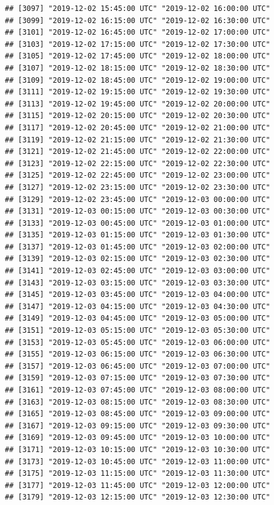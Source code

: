 \documentclass{article}\usepackage[]{graphicx}\usepackage[]{color}
\makeatletter
\newenvironment{kframe}{%
 \def\at@end@of@kframe{}%
 \ifinner\ifhmode%
  \def\at@end@of@kframe{\end{minipage}}%
  \begin{minipage}{\columnwidth}%
 \fi\fi%
 \def\FrameCommand##1{\hskip\@totalleftmargin \hskip-\fboxsep
 \colorbox{shadecolor}{##1}\hskip-\fboxsep
     \hskip-\linewidth \hskip-\@totalleftmargin \hskip\columnwidth}%
 \MakeFramed {\advance\hsize-\width
   \@totalleftmargin\z@ \linewidth\hsize
   \@setminipage}}%
 {\par\unskip\endMakeFramed%
 \at@end@of@kframe}
\newenvironment{knitrout}{}{} %
\makeatother
\begin{document}
\begin{knitrout}
\begin{kframe}
\begin{verbatim}
## [3097] "2019-12-02 15:45:00 UTC" "2019-12-02 16:00:00 UTC"
## [3099] "2019-12-02 16:15:00 UTC" "2019-12-02 16:30:00 UTC"
## [3101] "2019-12-02 16:45:00 UTC" "2019-12-02 17:00:00 UTC"
## [3103] "2019-12-02 17:15:00 UTC" "2019-12-02 17:30:00 UTC"
## [3105] "2019-12-02 17:45:00 UTC" "2019-12-02 18:00:00 UTC"
## [3107] "2019-12-02 18:15:00 UTC" "2019-12-02 18:30:00 UTC"
## [3109] "2019-12-02 18:45:00 UTC" "2019-12-02 19:00:00 UTC"
## [3111] "2019-12-02 19:15:00 UTC" "2019-12-02 19:30:00 UTC"
## [3113] "2019-12-02 19:45:00 UTC" "2019-12-02 20:00:00 UTC"
## [3115] "2019-12-02 20:15:00 UTC" "2019-12-02 20:30:00 UTC"
## [3117] "2019-12-02 20:45:00 UTC" "2019-12-02 21:00:00 UTC"
## [3119] "2019-12-02 21:15:00 UTC" "2019-12-02 21:30:00 UTC"
## [3121] "2019-12-02 21:45:00 UTC" "2019-12-02 22:00:00 UTC"
## [3123] "2019-12-02 22:15:00 UTC" "2019-12-02 22:30:00 UTC"
## [3125] "2019-12-02 22:45:00 UTC" "2019-12-02 23:00:00 UTC"
## [3127] "2019-12-02 23:15:00 UTC" "2019-12-02 23:30:00 UTC"
## [3129] "2019-12-02 23:45:00 UTC" "2019-12-03 00:00:00 UTC"
## [3131] "2019-12-03 00:15:00 UTC" "2019-12-03 00:30:00 UTC"
## [3133] "2019-12-03 00:45:00 UTC" "2019-12-03 01:00:00 UTC"
## [3135] "2019-12-03 01:15:00 UTC" "2019-12-03 01:30:00 UTC"
## [3137] "2019-12-03 01:45:00 UTC" "2019-12-03 02:00:00 UTC"
## [3139] "2019-12-03 02:15:00 UTC" "2019-12-03 02:30:00 UTC"
## [3141] "2019-12-03 02:45:00 UTC" "2019-12-03 03:00:00 UTC"
## [3143] "2019-12-03 03:15:00 UTC" "2019-12-03 03:30:00 UTC"
## [3145] "2019-12-03 03:45:00 UTC" "2019-12-03 04:00:00 UTC"
## [3147] "2019-12-03 04:15:00 UTC" "2019-12-03 04:30:00 UTC"
## [3149] "2019-12-03 04:45:00 UTC" "2019-12-03 05:00:00 UTC"
## [3151] "2019-12-03 05:15:00 UTC" "2019-12-03 05:30:00 UTC"
## [3153] "2019-12-03 05:45:00 UTC" "2019-12-03 06:00:00 UTC"
## [3155] "2019-12-03 06:15:00 UTC" "2019-12-03 06:30:00 UTC"
## [3157] "2019-12-03 06:45:00 UTC" "2019-12-03 07:00:00 UTC"
## [3159] "2019-12-03 07:15:00 UTC" "2019-12-03 07:30:00 UTC"
## [3161] "2019-12-03 07:45:00 UTC" "2019-12-03 08:00:00 UTC"
## [3163] "2019-12-03 08:15:00 UTC" "2019-12-03 08:30:00 UTC"
## [3165] "2019-12-03 08:45:00 UTC" "2019-12-03 09:00:00 UTC"
## [3167] "2019-12-03 09:15:00 UTC" "2019-12-03 09:30:00 UTC"
## [3169] "2019-12-03 09:45:00 UTC" "2019-12-03 10:00:00 UTC"
## [3171] "2019-12-03 10:15:00 UTC" "2019-12-03 10:30:00 UTC"
## [3173] "2019-12-03 10:45:00 UTC" "2019-12-03 11:00:00 UTC"
## [3175] "2019-12-03 11:15:00 UTC" "2019-12-03 11:30:00 UTC"
## [3177] "2019-12-03 11:45:00 UTC" "2019-12-03 12:00:00 UTC"
## [3179] "2019-12-03 12:15:00 UTC" "2019-12-03 12:30:00 UTC"

\end{verbatim}
\end{kframe}
\end{knitrout}
\end{document}
